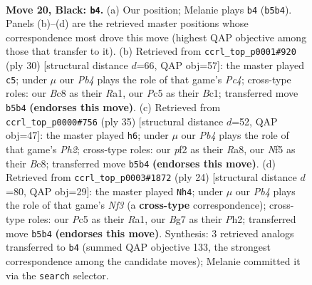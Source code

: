 \documentclass[11pt]{article}
\begin{document}
\clearpage

\begin{figure}[p]\centering
\begin{subfigure}{0.46\textwidth}\centering
\resizebox{\linewidth}{!}{%
\newchessgame
\chessboard[
  setfen={nrbr2k1/p3qpbp/8/1pp1pn1P/8/3PPB2/PP3P2/RNBQNRK1 b - - 7 20},
  showmover=false,
  pgfstyle=straightmove, color=movearrow, markmove={b5-b4}
]}
\caption{}
\end{subfigure}\hfill
\begin{subfigure}{0.46\textwidth}\centering
\resizebox{\linewidth}{!}{%
\newchessgame
\chessboard[
  setfen={r3br1k/ppq3pp/2nbp3/5p2/2PP4/3B1N2/P3QPPP/R1B2RK1 w - - 1 16},
  showmover=false,
  pgfstyle=straightmove, color=movearrow, markmove={c4-c5}
]}
\caption{}
\end{subfigure}
\\[4pt]
\begin{subfigure}{0.46\textwidth}\centering
\resizebox{\linewidth}{!}{%
\newchessgame
\chessboard[
  setfen={r1bqrbk1/5ppp/p2p1n2/n7/Np1PP3/5N1P/1PB1QPP1/R1BR2K1 b - - 1 18},
  showmover=false,
  pgfstyle=straightmove, color=movearrow, markmove={h7-h6}
]}
\caption{}
\end{subfigure}\hfill
\begin{subfigure}{0.46\textwidth}\centering
\resizebox{\linewidth}{!}{%
\newchessgame
\chessboard[
  setfen={r1bqk2r/pppnbpp1/3p3p/3P4/3P4/P2B1N2/1P3PPP/R1BQR1K1 w kq - 0 13},
  showmover=false,
  pgfstyle=straightmove, color=movearrow, markmove={f3-h4}
]}
\caption{}
\end{subfigure}
\caption{\textbf{Move 20, Black: \texttt{b4}.} (a) Our position; Melanie plays \texttt{b4} (\texttt{b5b4}). Panels (b)--(d) are the retrieved master positions whose correspondence most drove this move (highest QAP objective among those that transfer to it). (b) Retrieved from \texttt{ccrl\_top\_p0001\#920} (ply 30) [structural distance $d$=66, QAP obj=57]: the master played \texttt{c5}; under $\mu$ our \emph{Pb4} plays the role of that game's \emph{Pc4}; cross-type roles: our \emph{B}c8 as their \emph{R}a1, our \emph{P}c5 as their \emph{B}c1; transferred move \texttt{b5b4} \textbf{(endorses this move)}. (c) Retrieved from \texttt{ccrl\_top\_p0000\#756} (ply 35) [structural distance $d$=52, QAP obj=47]: the master played \texttt{h6}; under $\mu$ our \emph{Pb4} plays the role of that game's \emph{Ph2}; cross-type roles: our \emph{p}f2 as their \emph{R}a8, our \emph{N}f5 as their \emph{B}c8; transferred move \texttt{b5b4} \textbf{(endorses this move)}. (d) Retrieved from \texttt{ccrl\_top\_p0003\#1872} (ply 24) [structural distance $d$=80, QAP obj=29]: the master played \texttt{Nh4}; under $\mu$ our \emph{Pb4} plays the role of that game's \emph{Nf3} (a \textbf{cross-type} correspondence); cross-type roles: our \emph{P}c5 as their \emph{R}a1, our \emph{B}g7 as their \emph{P}h2; transferred move \texttt{b5b4} \textbf{(endorses this move)}. Synthesis: 3 retrieved analogs transferred to \texttt{b4} (summed QAP objective 133, the strongest correspondence among the candidate moves); Melanie committed it via the \texttt{search} selector.}
\label{fig:thought-m39}
\end{figure}
\end{document}
